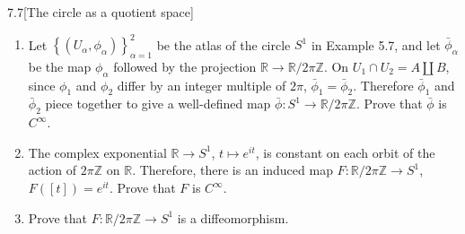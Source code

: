 \begin{problem}{7.7}[The circle as a quotient space]
\begin{enumerate}[label={(\alph*)},leftmargin=*]
    \item Let \( {\left\{ (U_{\alpha}, \phi_{\alpha}) \right\}}^{2}_{\alpha=1} \) be the atlas of the circle \( S^{1} \) in Example 5.7, and let \( \bar{\phi}_{\alpha} \) be the map \( \phi_{\alpha} \) followed by the projection \( \mathbb{R} \to \mathbb{R}/2\pi\mathbb{Z} \). On \( U_{1} \cap U_{2} = A \amalg B \), since \( \phi_{1} \) and \( \phi_{2} \) differ by an integer multiple of \( 2\pi \), \( \bar{\phi}_{1} = \bar{\phi}_{2} \). Therefore \( \bar{\phi}_{1} \) and \( \bar{\phi}_{2} \) piece together to give a well-defined map \( \bar{\phi}: S^{1} \to \mathbb{R}/2\pi\mathbb{Z} \). Prove that \( \bar{\phi} \) is \( C^{\infty} \).
    \item The complex exponential \( \mathbb{R} \to S^{1} \), \( t \mapsto e^{it} \), is constant on each orbit of the action of \( 2\pi\mathbb{Z} \) on \( \mathbb{R} \). Therefore, there is an induced map \( F: \mathbb{R}/2\pi\mathbb{Z} \to S^{1} \), \( F([t]) = e^{it} \). Prove that \( F \) is \( C^{\infty} \).
    \item Prove that \( F: \mathbb{R}/2\pi\mathbb{Z} \to S^{1} \) is a diffeomorphism.
\end{enumerate}
\end{problem}

